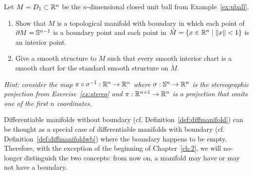 \begin{exercise}
	Let $M = D_1\subset \mathbb{R}^n$ be the $n$-dimensional closed unit ball from Example~\ref{ex:uball}.
	\begin{enumerate}
		\item Show that $M$ is a topological manifold with boundary in which each point of $\partial M = \mathbb{S}^{n-1}$ is a boundary point and each point in $\mathring M = \{x\in\mathbb{R}^n\mid\|x\|<1\}$ is an interior point.
		\item Give a smooth structure to $M$ such that every smooth interior chart is a smooth chart for the standard smooth structure on $\mathring M$.
	\end{enumerate}
	\textit{\small Hint: consider the map $\pi\circ\sigma^{-1}:\mathbb{R}^n\to\mathbb{R}^n$ where $\sigma:\mathbb{S}^n\to\mathbb{R}^n$ is the stereographic projection from Exercise~\ref{ex:stereo} and $\pi:\mathbb{R}^{n+1}\to\mathbb{R}^n$ is a projection that omits one of the first $n$ coordinates.}
\end{exercise}

\begin{tcolorbox}
	Differentiable manifolds without boundary (cf. Definition~\ref{def:diffmanifold}) can be thought as a special case of differentiable manifolds with boundary (cf. Definition~\ref{def:diffmanifoldwb}) where the boundary happens to be empty.
	Therefore, with the exception of the beginning of Chapter~\ref{ch:2}, we will no-longer distinguish the two concepts: from now on, a manifold may have or may not have a boundary.
\end{tcolorbox}
